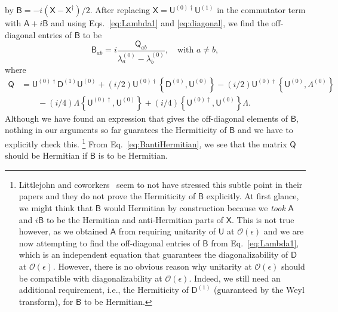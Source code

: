 by $\mathsf{B} = -i(\mathsf{X} - \mathsf{X}^{\dagger})/2$.
After replacing $\mathsf{X} = \mathsf{U}^{(0)\dagger}\mathsf{U}^{(1)}$ in the commutator term with $\mathsf{A} + i\mathsf{B}$ and using Eqs.~\eqref{eq:Lambda1} and \eqref{eq:diagonal}, we find the off-diagonal entries of $\mathsf{B}$ to be
%
\begin{equation}
  \mathsf{B}_{ab} = i\frac{\mathsf{Q}_{ab}}{\lambda^{(0)}_{a} - \lambda^{(0)}_{b}},
  \quad \text{with }a \neq b,
  \label{eq:BantiHermitian}
\end{equation}
%
where
%
\begin{equation}
  \begin{aligned}
    \mathsf{Q} &= \mathsf{U}^{(0)\dagger}\mathsf{D}^{(1)}\mathsf{U}^{(0)} + (i/2)\mathsf{U}^{(0)\dagger}\left\{\mathsf{D}^{(0)},\mathsf{U}^{(0)}\right\} - (i/2)\mathsf{U}^{(0)\dagger}\left\{\mathsf{U}^{(0)},\Lambda^{(0)}\right\}\\
               &\phantom{}\qquad -(i/4)\Lambda\left\{\mathsf{U}^{(0)\dagger}, \mathsf{U}^{(0)}\right\} +
  (i/4)\left\{\mathsf{U}^{(0)\dagger}, \mathsf{U}^{(0)}\right\}\Lambda.
  \end{aligned}
\end{equation}
%
Although we have found an expression that gives the off-diagonal elements of $\mathsf{B}$, nothing in our arguments so far guaratees the Hermiticity of $\mathsf{B}$ and we have to explicitly check this.%
\footnote{Littlejohn and coworkers~\cite{littlejohn1991,weigert1993} seem to not have stressed this subtle point in their papers and they do not prove the Hermiticity of $\mathsf{B}$ explicitly.
  At first glance, we might think that $\mathsf{B}$ would Hermitian by construction because we \emph{took} $\mathsf{\mathsf{A}}$ and $i\mathsf{B}$ to be the Hermitian and anti-Hermitian parts of $\mathsf{X}$.
  This is not true however, as we obtained $\mathsf{A}$ from requiring unitarity of $\mathsf{U}$ at $\mathcal{O}(\epsilon)$ and we are now attempting to find the off-diagonal entries of $\mathsf{B}$ from Eq.~\eqref{eq:Lambda1}, which is an independent equation that guarantees the diagonalizability of $\mathsf{D}$ at $\mathcal{O}(\epsilon)$.
  However, there is no obvious reason why unitarity at $\mathcal{O}(\epsilon)$ should be compatible with diagonalizability at $\mathcal{O}(\epsilon)$.
  Indeed, we still need an additional requirement, i.e., the Hermiticity of $\mathsf{D}^{(1)}$ (guaranteed by the Weyl transform), for $\mathsf{B}$ to be Hermitian.
}
From Eq.~\eqref{eq:BantiHermitian}, we see that the matrix $\mathsf{Q}$ should be Hermitian if $\mathsf{B}$ is to be Hermitian.
